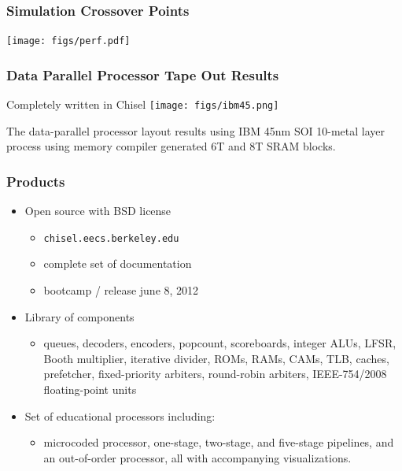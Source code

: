 \documentclass[xcolor=pdflatex,dvipsnames,table]{beamer}
\begin{document}
\begin{frame}
\frametitle{Simulation Crossover Points}

% 

\begin{center}
\texttt{[image: figs/perf.pdf]}
\end{center}


\end{frame}

\begin{frame}[fragile]
\frametitle{Data Parallel Processor Tape Out Results}

\begin{center}
Completely written in Chisel
\texttt{[image: figs/ibm45.png]}

\begin{footnotesize}
The data-parallel processor layout results using IBM 45nm SOI 10-metal layer process using memory compiler generated 6T and 8T SRAM blocks.
\end{footnotesize}
\end{center}

\end{frame}

\begin{frame}[fragile]
\frametitle{Products}

\begin{itemize}
\item Open source with BSD license
\begin{itemize}
\item \verb+chisel.eecs.berkeley.edu+
\item complete set of documentation
\item bootcamp / release june 8, 2012
\end{itemize}
\item Library of components
\begin{itemize}
\item queues, decoders, encoders, popcount, scoreboards, integer ALUs, LFSR, Booth multiplier, iterative divider, ROMs, RAMs, CAMs, TLB, caches, prefetcher, fixed-priority arbiters, round-robin arbiters, IEEE-754/2008 floating-point units
\end{itemize}
\item Set of educational processors including:
\begin{itemize}
\item microcoded processor, one-stage, two-stage, and five-stage pipelines, and an out-of-order processor, all with accompanying visualizations.
\end{itemize}
\end{itemize}

\end{frame}
\end{document}
